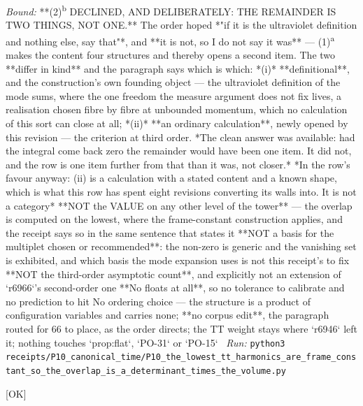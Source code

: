 \begin{description}
 \emph{Bound:}  **(2)\textsuperscript{b} DECLINED, AND DELIBERATELY: THE REMAINDER IS TWO THINGS, NOT ONE.** The order hoped *"if it is the ultraviolet definition and nothing else, say that"*, and **it is not, so I do not say it was** --- (1)\textsuperscript{a} makes the content four structures and thereby opens a second item. The two **differ in kind** and the paragraph says which is which: *(i)* **definitional**, and the construction's own founding object --- the ultraviolet definition of the mode sums, where the one freedom the measure argument does not fix lives, a realisation chosen fibre by fibre at unbounded momentum, which no calculation of this sort can close at all; *(ii)* **an ordinary calculation**, newly opened by this revision --- the criterion at third order.  *The clean answer was available: had the integral come back zero the remainder would have been one item. It did not, and the row is one item further from that than it was, not closer.*  *In the row's favour anyway: (ii) is a calculation with a stated content and a known shape, which is what this row has spent eight revisions converting its walls into. It is not a category*  **NOT the VALUE on any other level of the tower** --- the overlap is computed on the lowest, where the frame-constant construction applies, and the receipt says so in the same sentence that states it  **NOT a basis for the multiplet chosen or recommended**: the non-zero is generic and the vanishing set is exhibited, and which basis the mode expansion uses is not this receipt's to fix  **NOT the third-order asymptotic count**, and explicitly not an extension of `r6966`'s second-order one  **No floats at all**, so no tolerance to calibrate and no prediction to hit  No ordering choice --- the structure is a product of configuration variables and carries none; **no corpus edit**, the paragraph routed for 66 to place, as the order directs; the TT weight stays where `r6946` left it; nothing touches `prop:flat`, `PO-31` or `PO-15`
\ \emph{Run:} \texttt{python3 receipts/P10\_canonical\_time/P10\_the\_lowest\_tt\_harmonics\_are\_frame\_constant\_so\_the\_overlap\_is\_a\_determinant\_times\_the\_volume.py}
\item[\rcptlabel{P10_the_third_order_operator_is_regular_and_its_deficiency_indices_are_equal_so_a_realisation_exists}{P10R35}\textbf{P10R35}\quad\texttt{P10\_the\_third\_order\_operator\_is\_regular\_and\_its\_deficiency\_indices\_are\_equal\_so\_a\_realisation\_exists}]\hfill\textsf{[OK]}\\

\end{description}

